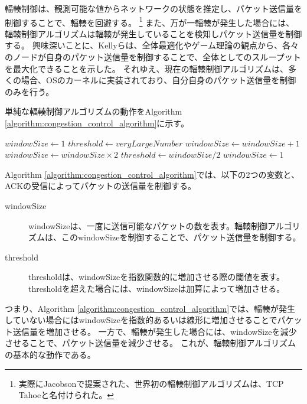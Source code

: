 \documentclass[a4paper,11pt]{jreport}
\newcommand{\algorithmref}[1]{Algorithm \ref{#1}}
\begin{document}
輻輳制御\cite{congestion-avoidance}は、観測可能な値からネットワークの状態を推定し、パケット送信量を制御することで、輻輳を回避する。
\footnote{実際にJacobson\cite{congestion-avoidance}で提案された、世界初の輻輳制御アルゴリズムは、TCP Tahoeと名付けられた。}
また、万が一輻輳が発生した場合には、輻輳制御アルゴリズムは輻輳が発生していることを検知しパケット送信量を制御する。
興味深いことに、Kellyら\cite{kelly1998rate}は、全体最適化やゲーム理論の観点から、各々のノードが自身のパケット送信量を制御することで、全体としてのスループットを最大化できることを示した。
それゆえ、現在の輻輳制御アルゴリズムは、多くの場合、OSのカーネルに実装されており、自分自身のパケット送信量を制御のみを行う。

単純な輻輳制御アルゴリズムの動作を\algorithmref{algorithm:congestion_control_algorithm}に示す。
\begin{algorithm}
  \caption{Basic Congestion Control Algorithm}
  \label{algorithm:congestion_control_algorithm}
  \begin{algorithmic}[1]
  \State $windowSize \gets 1$
  \State $threshold \gets veryLargeNumber$
            \State $windowSize \gets windowSize + 1$
        \Else
            \State $windowSize \gets windowSize \times 2$
        \EndIf
      \EndIf
          \State $threshold \gets windowSize / 2$
          \State $windowSize \gets 1$
      \EndIf
  \EndWhile
  \end{algorithmic}
\end{algorithm}
\algorithmref{algorithm:congestion_control_algorithm}では、以下の2つの変数と、ACKの受信によってパケットの送信量を制御する。
\begin{description}
  \item[windowSize]
  \item[] windowSizeは、一度に送信可能なパケットの数を表す。輻輳制御アルゴリズムは、このwindowSizeを制御することで、パケット送信量を制御する。
  \item[threshold]
  \item[] thresholdは、windowSizeを指数関数的に増加させる際の閾値を表す。thresholdを超えた場合には、windowSizeは加算によって増加させる。
\end{description}
つまり、\algorithmref{algorithm:congestion_control_algorithm}では、輻輳が発生していない場合にはwindowSizeを指数的あるいは線形に増加させることでパケット送信量を増加させる。
一方で、輻輳が発生した場合には、windowSizeを減少させることで、パケット送信量を減少させる。
これが、輻輳制御アルゴリズムの基本的な動作である。
\end{document}

